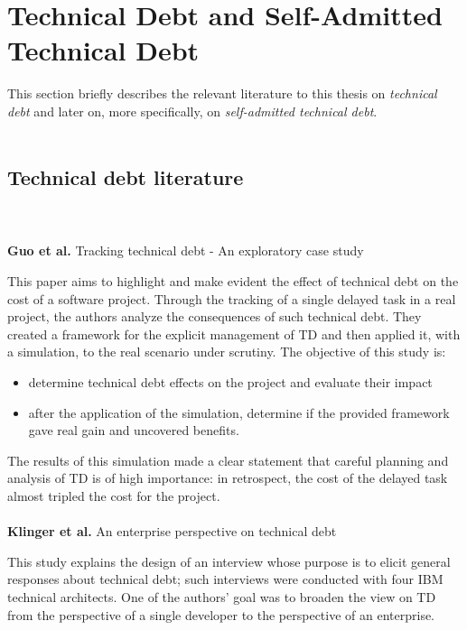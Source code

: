 \section{Technical Debt and Self-Admitted Technical Debt} %

This section briefly describes the relevant literature to this thesis on \emph{technical debt} and later on, more specifically, on \emph{self-admitted technical debt}.
\\
\\
\subsection{Technical debt literature}
\\
\\
\textbf{Guo et al.} \cite{guo2011tracking} Tracking technical debt - An exploratory case study

This paper aims to highlight and make evident the effect of technical debt on the cost of a software project. Through the tracking of a single delayed task in a real project, the authors analyze the consequences of such technical debt. They created a framework for the explicit management of TD and then applied it, with a simulation, to the real scenario under scrutiny.
The objective of this study is:
\begin{itemize}
    \item determine technical debt effects on the project and evaluate their impact
    \item after the application of the simulation, determine if the provided framework gave real gain and uncovered benefits.
\end{itemize}
The results of this simulation made a clear statement that careful planning and analysis of TD is of high importance: in retrospect, the cost of the delayed task almost tripled the cost for the project.
\\
\\
\textbf{Klinger et al.} \cite{klinger2011enterprise} An enterprise perspective on technical debt

This study explains the design of an interview whose purpose is to elicit general responses about technical debt; such interviews were conducted with four IBM technical architects. One of the authors' goal was to broaden the view on TD from the perspective of a single developer to the perspective of an enterprise.

